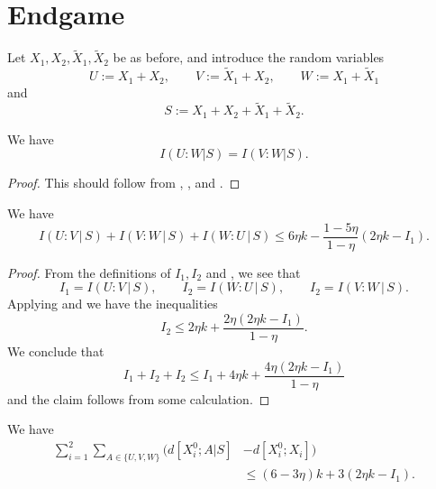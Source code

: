 \section{Endgame}

Let $X_1,X_2,\tilde X_1,\tilde X_2$ be as before, and introduce the random variables
\[U := X_1 + X_2, \qquad V := \tilde X_1 + X_2, \qquad W := X_1 + \tilde X_1\] and
\[  S := X_1 + X_2 + \tilde X_1 + \tilde X_2.\]

\begin{lemma}\label{symm-lemma}
  \leanok
We have
$$ I(U:W | S) = I(V:W | S).$$
\end{lemma}

\begin{proof}\leanok
This should follow from , , and .
\end{proof}

\begin{lemma}\label{uvw-s}
\leanok
We have
$$
I(U : V \, | \, S) + I(V : W \, | \,S) + I(W : U \, | \, S) \leq 6 \eta k - \frac{1 - 5 \eta}{1-\eta} (2 \eta k - I_1).
$$
\end{lemma}

\begin{proof}\leanok
From the definitions of $I_1,I_2$ and , we see that
\[
  I_1 = I(U : V \, | \, S), \qquad I_2 = I(W : U \, | \, S), \qquad I_2 = I(V : W \, | \,S).
\]
Applying  and  we have the inequalities
\[  I_2 \leq 2 \eta k + \frac{2\eta(2 \eta k - I_1)}{1-\eta} .
\]
We conclude that
$$
   I_1 + I_2 + I_2 \leq I_1+4\eta k+ \frac{4\eta(2 \eta k - I_1)}{1-\eta}
$$
and the claim follows from some calculation.
\end{proof}

\begin{lemma}\label{total-dist}\leanok
   We have
\begin{align*}
  \sum_{i=1}^2 \sum_{A\in\{U,V,W\}} \big(d[X^0_i;A|S] & - d[X^0_i;X_i]\big) \\
    &\leq (6 - 3\eta) k + 3(2 \eta k - I_1).
\end{align*}
\end{lemma}

